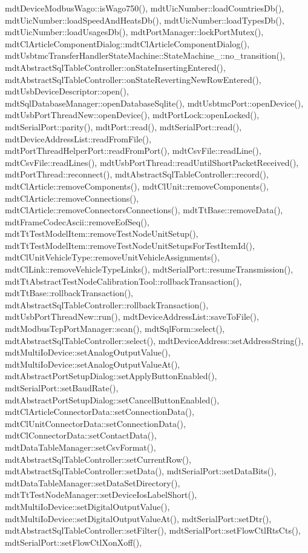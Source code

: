 mdt\-Device\-Modbus\-Wago\-::is\-Wago750(), mdt\-Uic\-Number\-::load\-Countries\-Db(), mdt\-Uic\-Number\-::load\-Speed\-And\-Heats\-Db(), mdt\-Uic\-Number\-::load\-Types\-Db(), mdt\-Uic\-Number\-::load\-Usages\-Db(), mdt\-Port\-Manager\-::lock\-Port\-Mutex(), mdt\-Cl\-Article\-Component\-Dialog\-::mdt\-Cl\-Article\-Component\-Dialog(), mdt\-Usbtmc\-Transfer\-Handler\-State\-Machine\-::\-State\-Machine\-\_\-\-::no\-\_\-transition(), mdt\-Abstract\-Sql\-Table\-Controller\-::on\-State\-Inserting\-Entered(), mdt\-Abstract\-Sql\-Table\-Controller\-::on\-State\-Reverting\-New\-Row\-Entered(), mdt\-Usb\-Device\-Descriptor\-::open(), mdt\-Sql\-Database\-Manager\-::open\-Database\-Sqlite(), mdt\-Usbtmc\-Port\-::open\-Device(), mdt\-Usb\-Port\-Thread\-New\-::open\-Device(), mdt\-Port\-Lock\-::open\-Locked(), mdt\-Serial\-Port\-::parity(), mdt\-Port\-::read(), mdt\-Serial\-Port\-::read(), mdt\-Device\-Address\-List\-::read\-From\-File(), mdt\-Port\-Thread\-Helper\-Port\-::read\-From\-Port(), mdt\-Csv\-File\-::read\-Line(), mdt\-Csv\-File\-::read\-Lines(), mdt\-Usb\-Port\-Thread\-::read\-Until\-Short\-Packet\-Received(), mdt\-Port\-Thread\-::reconnect(), mdt\-Abstract\-Sql\-Table\-Controller\-::record(), mdt\-Cl\-Article\-::remove\-Components(), mdt\-Cl\-Unit\-::remove\-Components(), mdt\-Cl\-Article\-::remove\-Connections(), mdt\-Cl\-Article\-::remove\-Connectors\-Connections(), mdt\-Tt\-Base\-::remove\-Data(), mdt\-Frame\-Codec\-Ascii\-::remove\-Eof\-Seq(), mdt\-Tt\-Test\-Model\-Item\-::remove\-Test\-Node\-Unit\-Setup(), mdt\-Tt\-Test\-Model\-Item\-::remove\-Test\-Node\-Unit\-Setups\-For\-Test\-Item\-Id(), mdt\-Cl\-Unit\-Vehicle\-Type\-::remove\-Unit\-Vehicle\-Assignments(), mdt\-Cl\-Link\-::remove\-Vehicle\-Type\-Links(), mdt\-Serial\-Port\-::resume\-Transmission(), mdt\-Tt\-Abstract\-Test\-Node\-Calibration\-Tool\-::rollback\-Transaction(), mdt\-Tt\-Base\-::rollback\-Transaction(), mdt\-Abstract\-Sql\-Table\-Controller\-::rollback\-Transaction(), mdt\-Usb\-Port\-Thread\-New\-::run(), mdt\-Device\-Address\-List\-::save\-To\-File(), mdt\-Modbus\-Tcp\-Port\-Manager\-::scan(), mdt\-Sql\-Form\-::select(), mdt\-Abstract\-Sql\-Table\-Controller\-::select(), mdt\-Device\-Address\-::set\-Address\-String(), mdt\-Multi\-Io\-Device\-::set\-Analog\-Output\-Value(), mdt\-Multi\-Io\-Device\-::set\-Analog\-Output\-Value\-At(), mdt\-Abstract\-Port\-Setup\-Dialog\-::set\-Apply\-Button\-Enabled(), mdt\-Serial\-Port\-::set\-Baud\-Rate(), mdt\-Abstract\-Port\-Setup\-Dialog\-::set\-Cancel\-Button\-Enabled(), mdt\-Cl\-Article\-Connector\-Data\-::set\-Connection\-Data(), mdt\-Cl\-Unit\-Connector\-Data\-::set\-Connection\-Data(), mdt\-Cl\-Connector\-Data\-::set\-Contact\-Data(), mdt\-Data\-Table\-Manager\-::set\-Csv\-Format(), mdt\-Abstract\-Sql\-Table\-Controller\-::set\-Current\-Row(), mdt\-Abstract\-Sql\-Table\-Controller\-::set\-Data(), mdt\-Serial\-Port\-::set\-Data\-Bits(), mdt\-Data\-Table\-Manager\-::set\-Data\-Set\-Directory(), mdt\-Tt\-Test\-Node\-Manager\-::set\-Device\-Ios\-Label\-Short(), mdt\-Multi\-Io\-Device\-::set\-Digital\-Output\-Value(), mdt\-Multi\-Io\-Device\-::set\-Digital\-Output\-Value\-At(), mdt\-Serial\-Port\-::set\-Dtr(), mdt\-Abstract\-Sql\-Table\-Controller\-::set\-Filter(), mdt\-Serial\-Port\-::set\-Flow\-Ctl\-Rts\-Cts(), mdt\-Serial\-Port\-::set\-Flow\-Ctl\-Xon\-Xoff(), 
